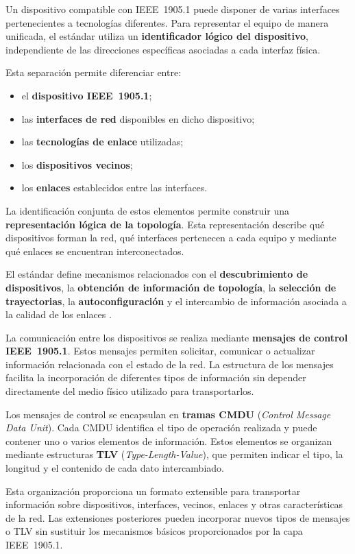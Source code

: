 Un dispositivo compatible con IEEE~1905.1 puede disponer de varias
interfaces pertenecientes a tecnologías diferentes. Para representar el
equipo de manera unificada, el estándar utiliza un
\textbf{identificador lógico del dispositivo}, independiente de las
direcciones específicas asociadas a cada interfaz física.

Esta separación permite diferenciar entre:

\begin{itemize}
    \item el \textbf{dispositivo IEEE~1905.1};
    \item las \textbf{interfaces de red} disponibles en dicho
    dispositivo;
    \item las \textbf{tecnologías de enlace} utilizadas;
    \item los \textbf{dispositivos vecinos};
    \item los \textbf{enlaces} establecidos entre las interfaces.
\end{itemize}

La identificación conjunta de estos elementos permite construir una
\textbf{representación lógica de la topología}. Esta representación
describe qué dispositivos forman la red, qué interfaces pertenecen a
cada equipo y mediante qué enlaces se encuentran interconectados.

El estándar define mecanismos relacionados con el
\textbf{descubrimiento de dispositivos}, la
\textbf{obtención de información de topología}, la
\textbf{selección de trayectorias}, la
\textbf{autoconfiguración} y el intercambio de información asociada a la
calidad de los enlaces \cite{ieee_1905_1}.

La comunicación entre los dispositivos se realiza mediante
\textbf{mensajes de control IEEE~1905.1}. Estos mensajes permiten
solicitar, comunicar o actualizar información relacionada con el estado
de la red. La estructura de los mensajes facilita la incorporación de
diferentes tipos de información sin depender directamente del medio
físico utilizado para transportarlos.

Los mensajes de control se encapsulan en
\textbf{tramas CMDU}
(\textit{Control Message Data Unit}). Cada CMDU identifica el tipo de
operación realizada y puede contener uno o varios elementos de
información. Estos elementos se organizan mediante estructuras
\textbf{TLV} (\textit{Type-Length-Value}), que permiten indicar el tipo,
la longitud y el contenido de cada dato intercambiado.

Esta organización proporciona un formato extensible para transportar
información sobre dispositivos, interfaces, vecinos, enlaces y otras
características de la red. Las extensiones posteriores pueden incorporar
nuevos tipos de mensajes o TLV sin sustituir los mecanismos básicos
proporcionados por la capa IEEE~1905.1.

